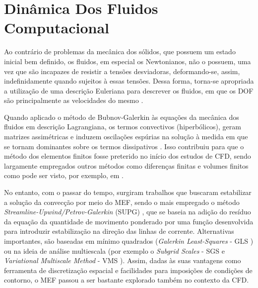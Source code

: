 \section{Dinâmica Dos Fluidos Computacional} \label{CFD}

Ao contrário de problemas da mecânica dos sólidos, que possuem um estado inicial bem definido, os fluidos, em especial os Newtonianos, não o possuem, uma vez que são incapazes de resistir a tensões desviadoras, deformando-se, assim, indefinidamente quando sujeitos à essas tensões. Dessa forma, torna-se apropriada a utilização de uma descrição Euleriana para descrever os fluidos, em que os DOF são principalmente as velocidades do mesmo \cite{fernandes2020tecnica}.

Quando aplicado o método de Bubnov-Galerkin às equações da mecânica dos fluidos em descrição Lagrangiana, os termos convectivos (hiperbólicos), geram matrizes assimétricas e induzem oscilações espúrias na solução à medida em que se tornam dominantes sobre os termos dissipativos \cite{bazilevs2013computational,brooks1982streamline}. Isso contribuiu para que o método dos elementos finitos fosse preterido no início dos estudos de CFD, sendo largamente empregados outros métodos como diferenças finitas e volumes finitos como pode ser visto, por exemplo, em .

No entanto, com o passar do tempo, surgiram trabalhos que buscaram estabilizar a solução da convecção por meio do MEF, sendo o mais empregado o método \textit{Streamline-Upwind/Petrov-Galerkin} (SUPG) \cite{brooks1982streamline}, que se baseia na adição do resíduo da equação da quantidade de movimento ponderado por uma função desenvolvida para introduzir estabilização na direção das linhas de corrente. Alternativas importantes, são baseadas em mínimo quadrados (\textit{Galerkin Least-Squares} - GLS \cite{hughes1989new,tezduyar1991stabilized}) ou na ideia de análise multiescala (por exemplo o \textit{Subgrid Scales} - SGS \cite{piomelli1999large,hughes2000large} e \textit{Variational Multiscale Method} - VMS \cite{hughes1995multiscale,hughes1998variational,hughes2000large}). Assim, dadas às suas vantagens como ferramenta de discretização espacial e facilidades para imposições de condições de contorno, o MEF passou a ser bastante explorado também no contexto da CFD.

